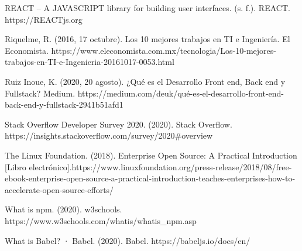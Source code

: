 \begin{thebibliography}{100}
\bibitem{} REACT – A JAVASCRIPT library for building user interfaces. (s. f.). REACT. https://REACTjs.org

\bibitem{} Riquelme, R. (2016, 17 octubre). Los 10 mejores trabajos en TI e Ingeniería. El Economista. https://www.eleconomista.com.mx/tecnologia/Los-10-mejores-trabajos-en-TI-e-Ingenieria-20161017-0053.html

\bibitem{} Ruiz Inoue, K. (2020, 20 agosto). ¿Qué es el Desarrollo Front end, Back end y Fullstack? Medium. https://medium.com/deuk/qué-es-el-desarrollo-front-end-back-end-y-fullstack-2941b51afd1

\bibitem{} Stack Overflow Developer Survey 2020. (2020). Stack Overflow. https://insights.stackoverflow.com/survey/2020#overview

\bibitem{} The Linux Foundation. (2018). Enterprise Open Source: A Practical Introduction [Libro electrónico].https://www.linuxfoundation.org/press-release/2018/08/free-ebook-enterprise-open-source-a-practical-introduction-teaches-enterprises-how-to-accelerate-open-source-efforts/

\bibitem{} What is npm. (2020). w3schools. https://www.w3schools.com/whatis/whatis_npm.asp

\bibitem{} What is Babel? · Babel. (2020). Babel. https://babeljs.io/docs/en/



\end{thebibliography}